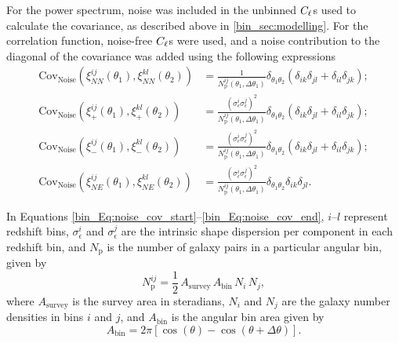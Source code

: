 For the power spectrum, noise was included in the unbinned $C_\ell$s used to calculate the covariance, as described above in \autoref{bin_sec:modelling}. For the correlation function, noise-free $C_\ell$s were used, and a noise contribution to the diagonal of the covariance was added using the following expressions \citep{Schneider2002, Joachimi2008, Heymans2013, Troxel2018}
\begin{align}
\text{Cov}_\text{Noise} \left( \xi^{ij}_{NN} \left( \theta_1 \right),
\xi^{kl}_{NN} \left( \theta_2 \right) \right)
&= \frac{1} {N_\text{p}^{ij} \left( \theta_1, \Delta \theta_1  \right)}
\delta_{\theta_1 \theta_2}
\left( \delta_{ik} \delta_{jl} + \delta_{il} \delta_{jk} \right);
\label{bin_Eq:noise_cov_start}
\\[1em]
%
\text{Cov}_\text{Noise} \left( \xi^{ij}_+ \left( \theta_1 \right),
\xi^{kl}_+ \left( \theta_2 \right) \right)
&= \frac{\left( \sigma_\epsilon^i \sigma_\epsilon^j \right)^2}
{N_\text{p}^{ij} \left( \theta_1, \Delta \theta_1  \right)}
\delta_{\theta_1 \theta_2}
\left( \delta_{ik} \delta_{jl} + \delta_{il} \delta_{jk} \right);
\\[1em]
%
\text{Cov}_\text{Noise} \left( \xi^{ij}_- \left( \theta_1 \right),
\xi^{kl}_- \left( \theta_2 \right) \right)
&= \frac{\left( \sigma_\epsilon^i \sigma_\epsilon^j \right)^2}
{N_\text{p}^{ij} \left( \theta_1, \Delta \theta_1  \right)}
\delta_{\theta_1 \theta_2}
\left( \delta_{ik} \delta_{jl} + \delta_{il} \delta_{jk} \right);
\\[1em]
%
\text{Cov}_\text{Noise} \left( \xi^{ij}_{NE} \left( \theta_1 \right),
\xi^{kl}_{NE} \left( \theta_2 \right) \right)
&= \frac{\left( \sigma_\epsilon^i \sigma_\epsilon^j \right)^2}
{N_\text{p}^{ij} \left( \theta_1, \Delta \theta_1  \right)}
\delta_{\theta_1 \theta_2}
\delta_{ik} \delta_{jl}.
\label{bin_Eq:noise_cov_end}
\end{align}

In Equations \eqref{bin_Eq:noise_cov_start}--\eqref{bin_Eq:noise_cov_end}, $i$--$l$ represent redshift bins, $\sigma_\epsilon^i$ and $\sigma_\epsilon^j$ are the intrinsic shape dispersion per component in each redshift bin, and $N_\text{p}$ is the number of galaxy pairs in a particular angular bin, given by \citep{Friedrich2021}
\begin{equation}
N_\text{p}^{ij} = \frac{1}{2} \, A_\text{survey} \, A_\text{bin} \, N_i \, N_j,
\end{equation}
where $A_\text{survey}$ is the survey area in steradians, $N_i$ and $N_j$ are the galaxy number densities in bins $i$ and $j$, and $A_\text{bin}$ is the angular bin area given by
\begin{equation}
A_\text{bin} = 2 \pi \left[
\cos{\left( \theta \right)}
-
\cos{\left( \theta + \Delta \theta \right)}
\right].
\end{equation}

